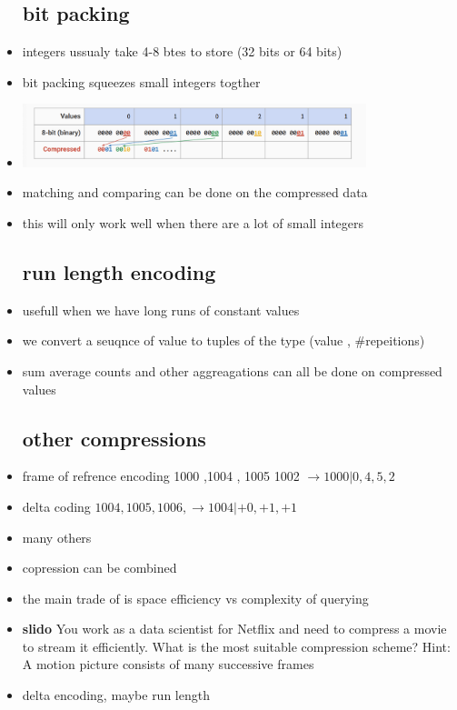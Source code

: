 \documentclass{article}
\begin{document}
\begin{itemize}
\subsection*{bit packing}
\item integers ussualy take 4-8 btes to store (32 bits or 64 bits)
\item bit packing squeezes small integers togther 
\item \includegraphics*[width=10cm]{images/Screenshot 2023-05-10 at 4.22.13 AM.png}
\item matching and comparing can be done on the compressed data 
\item this will only work well when there are a lot of small integers
\subsection*{run length encoding }
\item usefull when we have long runs of constant values 
\item we convert a seuqnce of value to tuples of the type (value , \#repeitions)
\item sum average counts and other aggreagations can all be done on compressed values 
\subsection*{other compressions}
\item frame of refrence encoding 1000 ,1004 , 1005 1002 $\rightarrow 1000| 0,4,5,2$
\item delta coding $1004, 1005,1006, \rightarrow 1004|+0, +1, +1$
\item many others 
\item copression can be combined
\item the main trade of is space efficiency vs complexity of querying 
\item \textbf{slido} You work as a data scientist for Netflix and
need to compress a movie to stream it
efficiently. What is the most suitable
compression scheme? Hint: A motion
picture consists of many successive
frames
\item delta encoding, maybe run length

\end{itemize}
\end{document}
